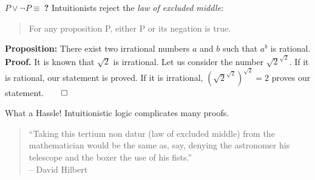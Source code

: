 \documentclass{beamer}
\begin{document}
\begin{frame}{$P\lor\lnot P\equiv\ $\textbf{?}}
Intuitionists reject the \emph{law of excluded middle}:
\begin{quote}
	For any proposition P, either P or its negation is true.
\end{quote}
	\pause
	\textbf{Proposition:} There exist two irrational numbers $a$ and $b$ such that $a^b$ is rational.\\\pause
	\vspace{\baselineskip}
	\textbf{Proof.} It is known that $\sqrt{2}$ is irrational. Let us consider the number $\sqrt{2}^{\sqrt{2}}$.\pause$ $ If it is rational, our statement is proved.\pause$ $ If it is irrational, $(\sqrt{2}^{\sqrt{2}})^{\sqrt{2}}=2$ proves our statement.\hfill$\qed$
\end{frame}
\begin{frame}{What a Hassle!}
Intuitionistic logic complicates many proofs.
\pause
\begin{quote}
``Taking this tertium non datur (law of excluded middle) from the mathematician would be the same as, say, denying the astronomer his telescope and the boxer the use of his fists.''\nocite{hilbert_tertium_non_datur}\\\hfill-- David Hilbert
\end{quote}
\begin{columns}[c,onlytextwidth]
\begin{column}{.15\textwidth}
\vspace{0.1\baselineskip}

\end{column}
\end{columns}
\end{frame}
\end{document}
